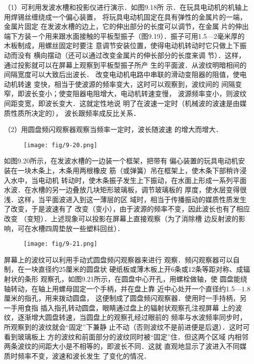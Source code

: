 （1）可利用发波水槽和投影仪进行演示．如图9.18所
示．在玩具电动机的机轴上用焊锡丝缠绕成一个偏心装置，
将玩具电动机固定在具有弹性的金属片的一端，金属片固定
在发波水槽的边上，它的伸出部分的长度可以调节，在金属
片的伸出端下方装－个用来跟水面接触的平板型振子（图9.19）．振子可用1.5—2毫米厚的木板制成，用螺丝固定时要注
意调节安装位置，使得电动机转动时它只做上下振动而没有
横向摆动（还可以通过改变金属片的伸长部分的长度来调
节）．这样，通过投影就可以在屏幕上观察到平板型振子所产
生的平面波．从波纹明暗相间的间隔宽度可以大致后出波长．
改变电动机电路中串联的滑动变阻器的阻值，使电动机转速
变快，相当于使波源的频率变大，这时可以观察到，波纹间的
间隔变窄，即波长变小；使变阻器电阻增大，电动机转速变慢，
波源频率变小，则波纹间距变宽，即波长变大．这就定性地说
明了在波速一定时（机械波的波速是由媒质性质所决定的），
波长跟频率成反比关系．

（2）用圆盘频闪观察器观察当频率一定时，波长随波速
的增大而增大．
\begin{figure}[htp]
    \centering
    \texttt{[image: fig/9-20.png]}
    \caption{}
\end{figure}

如图9.20所示，在发波水槽的一边装一个框架，把带有
偏心装置的玩具电动机安装在一块木条上，木条用两根橡皮
筋（或弹簧）吊在框架上，使木条下部稍许浸入水中，当电动机
转动时，使木条振子发生上下振动，在水面上形成一系列平面
水波．在水槽的另一边叠放几块矩形玻璃板，调节玻璃板的
厚度，使水层变得很浅．这样，当平面波进入到这一薄层的区
域时，相当于传播振动的媒质性质发生了改变，于是波速有了
改变（变小），由于波源的频率不变，因此波长也有了相应改变
（变短）．上述现象可以投影在屏幕上直接观察（为了消除槽
边反射波的影响，可在水槽四周垫放一些塑料回丝）．

\begin{figure}[htp]
    \centering
    \texttt{[image: fig/9-21.png]}
    \caption{}
\end{figure}

屏幕上的波纹可以利用手动式圆盘频闪观察器来进行
观察．频闪观察器可以自制，在一块直径约25厘米的圆盘状
硬纸板或薄木板上开6条或12条等距对称、成辐射状的条形
观察孔，如图9.21所示，在圆盘中心开孔，用螺栓做轴，使
圆盘能绕轴转动，在轴上用螺母固定一个手柄，并在盘上靠
近中心处开一个直径约1.5—1.8厘米的指孔，用来拨动圆盘，
这便制成了圆盘频闪观察器．使用时一手持柄，另一手用食指
插入指孔转动圆盘，眼睛通过盘上的辐射状观察孔注视屏幕
上的波纹，逐渐增大圆盘转速，当圆盘上的观察孔经过眼前的
频率与水波频率同步时，所观察到的波纹就会“固定”下兼静
止不动（否则波纹不是前进便是后退）．这时可看到玻璃板上
方的波纹和前面部分的波纹同时被“固定”住．但这两个区域
内相邻两条波纹的间距大小是不相等的，即波长不同．这就
直观地显示了波进入不同媒质时频率不变，波速和波长发生
了变化的情况．

